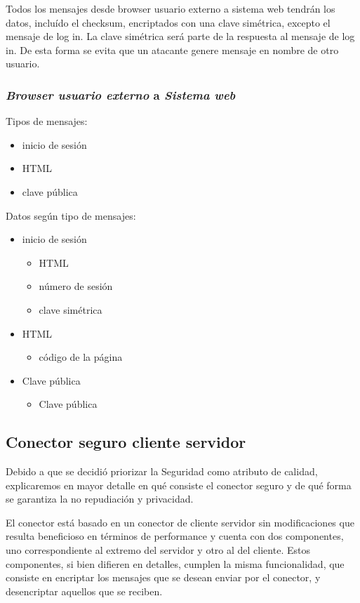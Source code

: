 Todos los mensajes desde browser usuario externo a sistema web tendrán los datos, incluído el checksum, encriptados con una clave simétrica, excepto el mensaje de log in. La clave simétrica será parte de la respuesta al mensaje de log in. De esta forma se evita que un atacante genere mensaje en nombre de otro usuario.

\subsubsection{\emph{Browser usuario externo} a \emph{Sistema web}}


Tipos de mensajes:
\begin{itemize}
 \item inicio de sesión
 \item HTML
 \item clave pública
\end{itemize}


Datos según tipo de mensajes:
\begin{itemize}
 \item inicio de sesión
 \begin{itemize}
  \item HTML
  \item número de sesión
  \item clave simétrica
 \end{itemize}
 \item HTML
  \begin{itemize}
   \item código de la página
  \end{itemize}

 \item Clave pública
  \begin{itemize}
   \item Clave pública
  \end{itemize}
\end{itemize}


\subsection{Conector seguro cliente servidor}

Debido a que se decidió priorizar la Seguridad como atributo de calidad, explicaremos en mayor detalle en qué consiste el conector seguro y de qué forma se garantiza la no repudiación y privacidad.

El conector está basado en un conector de cliente servidor sin modificaciones que resulta beneficioso en términos de performance y cuenta con dos componentes, uno correspondiente al extremo del servidor y otro al del cliente. 
Estos componentes, si bien difieren en detalles, cumplen la misma funcionalidad, que consiste en encriptar los mensajes que se desean enviar por el conector, y desencriptar aquellos que se reciben.


